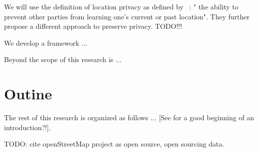 We will use the definition of location privacy as defined by ~\parencite{location-privacy}: " the ability to prevent other parties from learning
one’s current or past location". They further propose a different approach to preserve privacy. TODO!!!

We develop a framework ... 

Beyond the scope of this research is ...

\section{Outine}

The rest of this research is organized as follows ... [See \parencite{gruteser2003anonymous} for a good beginning of an introduction?!].

TODO: cite openStreetMap project as open source, open sourcing data.